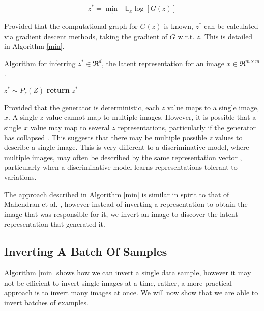 \documentclass[journal]{IEEEtran}
\begin{document}
\begin{equation} \label{cost}
    z^* = \min_z   {- \mathbb E}_x \log[G(z)] 
\end{equation}

Provided that the computational graph for $G(z)$ is known, $z^*$ can be calculated via gradient descent methods, taking the gradient of $G$ w.r.t. $z$. This is detailed in Algorithm \ref{min}.


  
    

\begin{algorithm}

\caption{Algorithm for inferring $z^* \in \Re^d$, the latent representation for an image $x \in \Re^{m \times m}$.}\label{min}
$z^* \sim P_z(Z)$ \;
\textbf{return} $z^*$ \;

\end{algorithm}

Provided that the generator is deterministic, each $z$ value maps to a single image, $x$. A single $z$ value cannot map to multiple images. However, it is possible that a single $x$ value may map to several $z$ representations, particularly if the generator has collapsed \cite{salimans2016improved}. This suggests that there may be multiple possible $z$ values to describe a single image. This is very different to a discriminative model, where multiple images, may often be described by the same representation vector \cite{mahendran2015understanding}, particularly when a discriminative model learns representations tolerant to variations.

The approach described in Algorithm \ref{min} is similar in spirit to that of Mahendran et al. \cite{mahendran2015understanding}, however instead of inverting a representation to obtain the image that was responsible for it, we invert an image to discover the latent representation that generated it. %




\subsection{Inverting A Batch Of Samples}
\label{sec:batch}


Algorithm \ref{min} shows how we can invert a single data sample, however it may not be efficient to invert single images at a time, rather, a more practical approach is to invert many images at once. We will now show that we are able to invert batches of examples.
\end{document}
